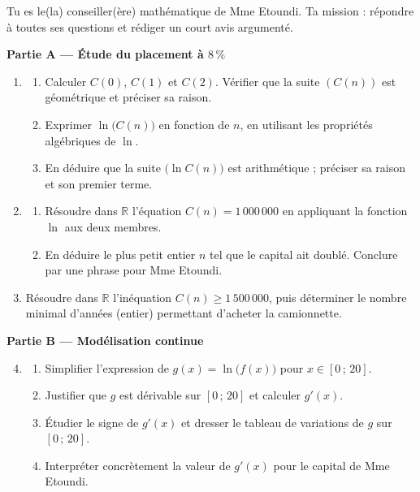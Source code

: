 \documentclass[11pt]{article}
\newcounter{popsec}
\newcounter{popsub}
\newcommand{\courssub}[1]{%
  \stepcounter{popsub}%
  \par\vspace{9pt}\noindent{\popxbold\fontsize{11.5}{13}\selectfont\color{popink}{\color{poporange}\thepopsec.\thepopsub}\hspace{6pt}#1}\par\nopagebreak\vspace{4pt}
}
\begin{document}
Tu es le(la) conseiller(ère) mathématique de Mme Etoundi. Ta mission : répondre à toutes ses questions et rédiger un court avis argumenté.

\courssub{Consignes}

\textbf{Partie A — Étude du placement à $8\,\%$}\par
\begin{enumerate}
\item \begin{enumerate}
\item Calculer $C(0)$, $C(1)$ et $C(2)$. Vérifier que la suite $(C(n))$ est géométrique et préciser sa raison.
\item Exprimer $\ln\big(C(n)\big)$ en fonction de $n$, en utilisant les propriétés algébriques de $\ln$.
\item En déduire que la suite $\big(\ln C(n)\big)$ est arithmétique ; préciser sa raison et son premier terme.
\end{enumerate}
\item \begin{enumerate}
\item Résoudre dans $\mathbb{R}$ l'équation $C(n) = 1\,000\,000$ en appliquant la fonction $\ln$ aux deux membres.
\item En déduire le plus petit entier $n$ tel que le capital ait doublé. Conclure par une phrase pour Mme Etoundi.
\end{enumerate}
\item Résoudre dans $\mathbb{R}$ l'inéquation $C(n) \geq 1\,500\,000$, puis déterminer le nombre minimal d'années (entier) permettant d'acheter la camionnette.
\end{enumerate}

\textbf{Partie B — Modélisation continue}\par
\begin{enumerate}
\setcounter{enumi}{3}
\item \begin{enumerate}
\item Simplifier l'expression de $g(x) = \ln\big(f(x)\big)$ pour $x \in [0\,;\,20]$.
\item Justifier que $g$ est dérivable sur $[0\,;\,20]$ et calculer $g'(x)$.
\item Étudier le signe de $g'(x)$ et dresser le tableau de variations de $g$ sur $[0\,;\,20]$.
\item Interpréter concrètement la valeur de $g'(x)$ pour le capital de Mme Etoundi.
\end{enumerate}
\end{enumerate}
\end{document}
